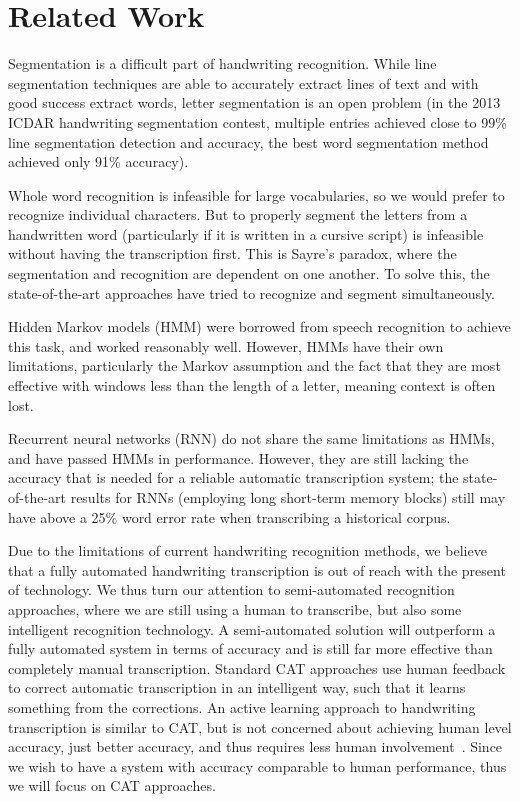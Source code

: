 \documentclass[ms]{byuprop}
\begin{document}
\section{Related Work}

Segmentation is a difficult part of handwriting recognition. While line segmentation techniques are able to accurately extract lines of text and with good success extract words, letter segmentation is an open problem (in the 2013 ICDAR handwriting segmentation contest, multiple entries achieved close to 99\% line segmentation detection and accuracy, the best word segmentation method achieved only 91\% accuracy\cite{icdar_segmentation2013}).

Whole word recognition is infeasible for large vocabularies, so we would prefer to recognize individual characters. But to properly segment the letters from a handwritten word (particularly if it is written in a cursive script) is infeasible without having the transcription first. This is Sayre's paradox, where the segmentation and recognition are dependent on one another.\cite{sayres} To solve this, the state-of-the-art approaches have tried to recognize and segment simultaneously.

Hidden Markov models (HMM) were borrowed from speech recognition to achieve this task, and worked reasonably well\cite{Marti2001}. However, HMMs have their own limitations, particularly the Markov assumption and the fact that they are most effective with windows less than the length of a letter, meaning context is often lost.

Recurrent neural networks (RNN) do not share the same limitations as HMMs, and have passed HMMs in performance\cite{Graves2009hmm}. However, they are still lacking the accuracy that is needed for a reliable automatic transcription system; the state-of-the-art results for RNNs (employing long short-term memory blocks) still may have above a 25\% word error rate when transcribing a historical corpus\cite{icdarComp2015}.



Due to the limitations of current handwriting recognition methods, we believe that a fully automated handwriting transcription is out of reach with the present of technology. We thus turn our attention to semi-automated recognition approaches, where we are still using a human to transcribe, but also some intelligent recognition technology. A semi-automated solution will outperform a fully automated system in terms of accuracy and is still far more effective than completely manual transcription. Standard CAT approaches use human feedback to correct automatic transcription in an intelligent way, such that it learns something from the corrections. An active learning approach to handwriting transcription is similar to CAT, but is not concerned about achieving human level accuracy, just better accuracy, and thus requires less human involvement~\cite{Serrano2010}. Since we wish to have a system with accuracy comparable to human performance, thus we will focus on CAT approaches.
\end{document}
